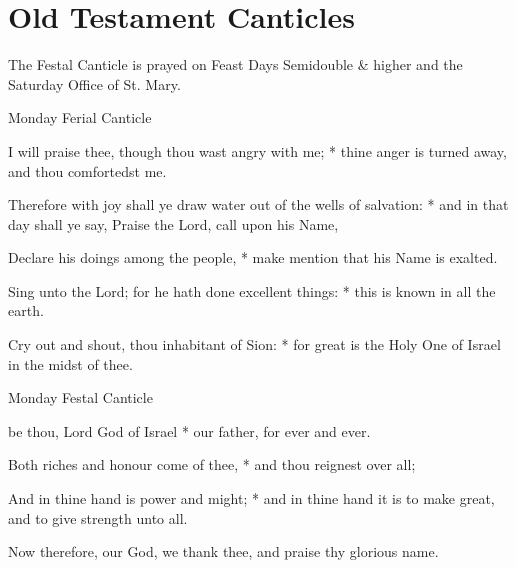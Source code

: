 \section{Old Testament Canticles}\label{OT}
\begin{secrubric}
    The Festal Canticle is prayed on Feast Days Semidouble \& higher and the Saturday Office of St. Mary.
\end{secrubric}
\begin{multicols}{2}
\begin{inhead}
Monday Ferial Canticle
\end{inhead}
 I will praise thee, though thou wast angry with me; * thine anger is turned away, and thou comfortedst me.\par
{}
Therefore with joy shall ye draw water out of the wells of salvation: * and in that day shall ye say, Praise the Lord, call upon his Name,\par
Declare his doings among the people, * make mention that his Name is exalted.\par
Sing unto the Lord; for he hath done excellent things: * this is known in all the earth.\par
Cry out and shout, thou inhabitant of Sion: * for great is the Holy One of Israel in the midst of thee.
\begin{inhead}
Monday Festal Canticle
\end{inhead}
 be thou, Lord God of Israel * our father, for ever and ever.\par
{}
Both riches and honour come of thee, * and thou reignest over all;\par
And in thine hand is power and might; * and in thine hand it is to make great, and to give strength unto all.\par
Now therefore, our God, we thank thee, and praise thy glorious name.
\begin{inhead}

\end{inhead}
\end{multicols}
